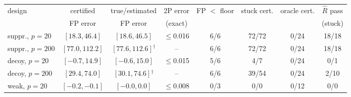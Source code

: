 \begin{tabular}{lccccccc}
\toprule
design & certified & true/estimated & 2P error & FP $<$ floor & stuck cert. & oracle cert. & $\widehat R$ pass \\
 & FP error & FP error & (exact) & & & & (stuck) \\
\midrule
suppr., $p{=}20$ & $[18.3,46.4]$ & $[18.6,46.5]$ & $\le$0.016 & 6/6 & 72/72 & 0/24 & 18/18 \\
suppr., $p{=}200$ & $[77.0,112.2]$ & $[77.6,112.6]$$^\dagger$ & -- & 6/6 & 72/72 & 0/24 & 18/18 \\
decoy, $p{=}20$ & $[-0.7,14.9]$ & $[-0.6,15.0]$ & $\le$0.015 & 5/6 & 4/7 & 0/24 & 0/1 \\
decoy, $p{=}200$ & $[29.4,74.0]$ & $[30.1,74.6]$$^\dagger$ & -- & 6/6 & 39/54 & 0/24 & 2/10 \\
weak, $p{=}20$ & $[-0.2,-0.1]$ & $[-0.0,0.0]$ & $\le$0.008 & 0/3 & 0/0 & 0/12 & 0/0 \\
\bottomrule
\end{tabular}
